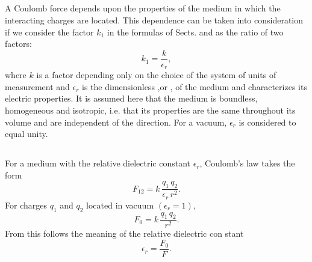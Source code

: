 \subsection{}\label{14.2.4} A Coulomb force  depends upon the properties of the medium in which the interacting charges are located. This dependence can be taken into consideration if we consider the factor $k_{1}$ in the formulas of Sects.  and  as the ratio of two factors:
\begin{equation*}%
k_{1} = \frac{k}{\epsilon_{r}},
\end{equation*}
where $k$ is a factor depending only on the choice of the system of units of measurement and $\epsilon_{r}$ is the dimensionless ,or , of the medium and characterizes its electric properties. It is assumed here that the medium is boundless, homogeneous and isotropic, i.e. that its properties are the same throughout its volume and are independent of the direction. For a vacuum, $\epsilon_{r}$ is considered to equal unity. 

\subsection{}\label{14.2.5} For a medium with the relative dielectric constant $\epsilon_{r}$, Coulomb's law takes the form
\begin{equation*}%
F_{12} = k \,\frac{q_{1}\,q_{2}}{\epsilon_{r} \, r^{2}}.
\end{equation*}
For charges $q_{1}$ and $q_{2}$ located in vacuum $(\epsilon_{r} = 1)$,
\begin{equation*}%
F_{0} = k \,\frac{q_{1}\,q_{2}}{r^{2}}.
\end{equation*}
From this follows the meaning of the relative dielectric con­ stant
\begin{equation*}%
\epsilon_{r} = \frac{F_{0}}{F}.
\end{equation*}


